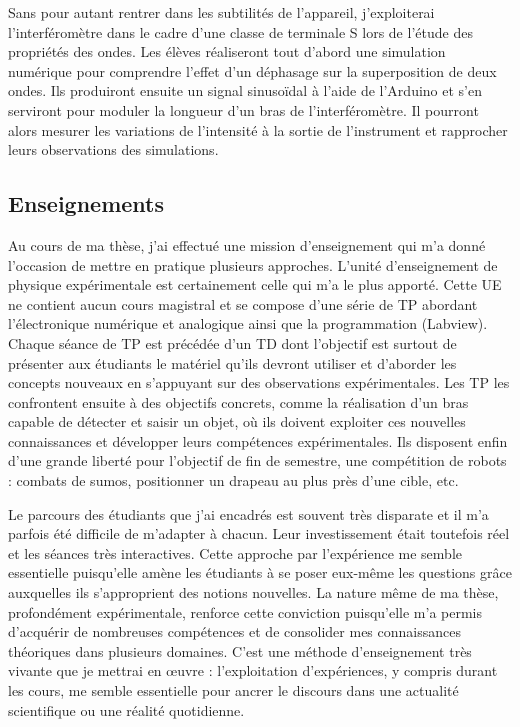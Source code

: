 \documentclass[12pt,a4paper]{article}
\begin{document}
Sans pour autant rentrer dans les subtilités de l'appareil, j'exploiterai l'interféromètre dans le cadre d'une classe de terminale S lors de l'étude des propriétés des ondes.
Les élèves réaliseront tout d'abord une simulation numérique pour comprendre l'effet d'un déphasage sur la superposition de deux ondes.
Ils produiront ensuite un signal sinusoïdal à l'aide de l'Arduino et s'en serviront pour moduler la longueur d'un bras de l'interféromètre.
Il pourront alors mesurer les variations de l'intensité à la sortie de l'instrument et rapprocher leurs observations des simulations. 

\subsection{Enseignements}

Au cours de ma thèse, j'ai effectué une mission d'enseignement qui m'a donné l'occasion de mettre en pratique plusieurs approches.
L'unité d'enseignement de physique expérimentale est certainement celle qui m'a le plus apporté.
Cette UE ne contient aucun cours magistral et se compose d'une série de TP abordant l'électronique numérique et analogique ainsi que la programmation (Labview).
Chaque séance de TP est précédée d'un TD dont l'objectif est surtout de présenter aux étudiants le matériel qu'ils devront utiliser et d'aborder les concepts nouveaux en s'appuyant sur des observations expérimentales.
Les TP les confrontent ensuite à des objectifs concrets, comme la réalisation d'un bras capable de détecter et saisir un objet, où ils doivent exploiter ces nouvelles connaissances et développer leurs compétences expérimentales.
Ils disposent enfin d'une grande liberté pour l'objectif de fin de semestre, une compétition de robots : combats de \og sumos\fg{}, positionner un drapeau au plus près d'une cible, etc.

Le parcours des étudiants que j'ai encadrés est souvent très disparate et il m'a parfois été difficile de m'adapter à chacun.
Leur investissement était toutefois réel et les séances très interactives.
Cette approche par l'expérience me semble essentielle puisqu'elle amène les étudiants à se poser eux-même les questions grâce auxquelles ils s'approprient des notions nouvelles.
La nature même de ma thèse, profondément expérimentale, renforce cette conviction puisqu'elle m'a permis d'acquérir de nombreuses compétences et de consolider mes connaissances théoriques dans plusieurs domaines.
C'est une méthode d'enseignement très vivante que je mettrai en œuvre : l'exploitation d'expériences, y compris durant les cours, me semble essentielle pour ancrer le discours dans une actualité scientifique ou une réalité quotidienne.
\end{document}

